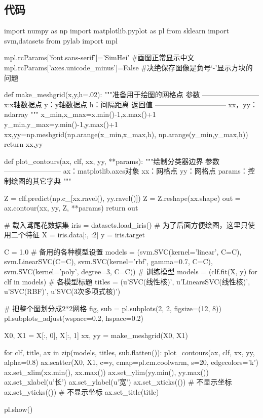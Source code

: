 \documentclass[12pt]{article}
\begin{document}
\subsection{代码}
\begin{python}
import numpy as np
import matplotlib.pyplot as pl
from sklearn import svm,datasets
from pylab import mpl

mpl.rcParams['font.sans-serif']='SimHei' #画图正常显示中文
mpl.rcParams['axes.unicode_minus']=False #决绝保存图像是负号‘-’显示方块的问题

def make_meshgrid(x,y,h=.02):
    """准备用于绘图的网格点
    参数
    ————————
    x:x轴数据点
    y：y轴数据点
    h：间隔距离
    返回值
    ——————————
    xx，yy：ndarray
    """
    x_min,x_max=x.min()-1,x.max()+1
    y_min,y_max=y.min()-1,y.max()+1
    xx,yy=np.meshgrid(np.arange(x_min,x_max,h),
                     np.arange(y_min,y_max,h))
    return xx,yy


def plot_contours(ax, clf, xx, yy, **params):
    """绘制分类器边界
    参数
    ————————
    ax：matplotlib.axes对象
    xx：网格点
    yy：网格点
    params：控制绘图的其它字典
    """

    Z = clf.predict(np.c_[xx.ravel(), yy.ravel()])
    Z = Z.reshape(xx.shape)
    out = ax.contour(xx, yy, Z, **params)
    return out


# 载入鸢尾花数据集
iris = datasets.load_iris()
# 为了后面方便绘图，这里只使用二个特征
X = iris.data[:, :2]
y = iris.target

C = 1.0
# 备用的各种模型设置
models = (svm.SVC(kernel='linear', C=C),
          svm.LinearSVC(C=C),
          svm.SVC(kernel='rbf', gamma=0.7, C=C),
          svm.SVC(kernel='poly', degree=3, C=C))
# 训练模型
models = (clf.fit(X, y) for clf in models)
# 各模型标题
titles = (u'SVC(线性核)',
          u'LinearsSVC(线性核)',
          u'SVC(RBF)',
          u'SVC(3次多项式核)')

# 把整个图划分成2*2网格
fig, sub = pl.subplots(2, 2, figsize=(12, 8))
pl.subplots_adjust(wspace=0.2, hspace=0.2)

X0, X1 = X[:, 0], X[:, 1]
xx, yy = make_meshgrid(X0, X1)

for clf, title, ax in zip(models, titles, sub.flatten()):
    plot_contours(ax, clf, xx, yy, alpha=0.8)
    ax.scatter(X0, X1, c=y, cmap=pl.cm.coolwarm, s=20, edgecolors='k')
    ax.set_xlim(xx.min(), xx.max())
    ax.set_ylim(yy.min(), yy.max())
    ax.set_xlabel(u'长')
    ax.set_ylabel(u'宽')
    ax.set_xticks(())  # 不显示坐标
    ax.set_yticks(())  # 不显示坐标
    ax.set_title(title)

pl.show()

\end{python}





\end{document}
